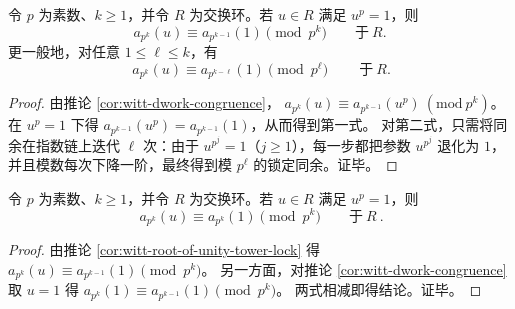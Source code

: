\begin{corollary}[\texorpdfstring{$u^p=1$}{u^p=1} 的塔式锁定：扭曲迹被推回无扭曲层]\label{cor:witt-root-of-unity-tower-lock}
令 \(p\) 为素数、\(k\ge 1\)，并令 \(R\) 为交换环。若 \(u\in R\) 满足 \(u^p=1\)，则
\[
a_{p^k}(u)\equiv a_{p^{k-1}}(1)\pmod{p^k}\qquad\text{于}\ R.
\]
更一般地，对任意 \(1\le \ell\le k\)，有
\[
\boxed{\ a_{p^k}(u)\equiv a_{p^{k-\ell}}(1)\pmod{p^\ell}\ }\qquad\text{于}\ R.
\]
\end{corollary}
\begin{proof}
由推论 \ref{cor:witt-dwork-congruence}，
\(
a_{p^k}(u)\equiv a_{p^{k-1}}(u^p)\ (\mathrm{mod}\ p^k)
\)。
在 \(u^p=1\) 下得 \(a_{p^{k-1}}(u^p)=a_{p^{k-1}}(1)\)，从而得到第一式。
对第二式，只需将同余在指数链上迭代 \(\ell\) 次：由于 \(u^{p^j}=1\)（\(j\ge 1\)），每一步都把参数 \(u^{p^j}\) 退化为 \(1\)，并且模数每次下降一阶，最终得到模 \(p^\ell\) 的锁定同余。证毕。
\end{proof}

\begin{corollary}\label{cor:witt-cyclotomic-invisibility}
令 \(p\) 为素数、\(k\ge 1\)，并令 \(R\) 为交换环。若 \(u\in R\) 满足 \(u^p=1\)，则
\[
\boxed{\ a_{p^k}(u)\equiv a_{p^k}(1)\pmod{p^k}\qquad\text{于}\ R\ }.
\]
\end{corollary}
\begin{proof}
由推论 \ref{cor:witt-root-of-unity-tower-lock} 得 \(a_{p^k}(u)\equiv a_{p^{k-1}}(1)\pmod{p^k}\)。
另一方面，对推论 \ref{cor:witt-dwork-congruence} 取 \(u=1\) 得 \(a_{p^k}(1)\equiv a_{p^{k-1}}(1)\pmod{p^k}\)。
两式相减即得结论。证毕。
\end{proof}

